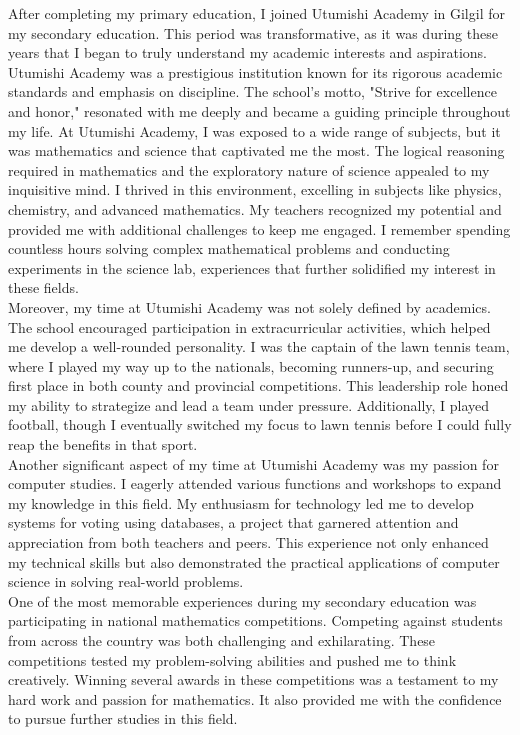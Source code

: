 \documentclass[12pt,a4paper,sans,english]{report}
\begin{document}
\noindent	After completing my primary education, I joined Utumishi Academy in Gilgil for my secondary education. This period was transformative, as it was during these years that I began to truly understand my academic interests and aspirations. Utumishi Academy was a prestigious institution known for its rigorous academic standards and emphasis on discipline. The school’s motto, "Strive for excellence and honor," resonated with me deeply and became a guiding principle throughout my life.	At Utumishi Academy, I was exposed to a wide range of subjects, but it was mathematics and science that captivated me the most. The logical reasoning required in mathematics and the exploratory nature of science appealed to my inquisitive mind. I thrived in this environment, excelling in subjects like physics, chemistry, and advanced mathematics. My teachers recognized my potential and provided me with additional challenges to keep me engaged. I remember spending countless hours solving complex mathematical problems and conducting experiments in the science lab, experiences that further solidified my interest in these fields.\\
	

\noindent Moreover, my time at Utumishi Academy was not solely defined by academics. The school encouraged participation in extracurricular activities, which helped me develop a well-rounded personality. I was the captain of the lawn tennis team, where I played my way up to the nationals, becoming runners-up, and securing first place in both county and provincial competitions. This leadership role honed my ability to strategize and lead a team under pressure. Additionally, I played football, though I eventually switched my focus to lawn tennis before I could fully reap the benefits in that sport.\\

\noindent Another significant aspect of my time at Utumishi Academy was my passion for computer studies. I eagerly attended various functions and workshops to expand my knowledge in this field. My enthusiasm for technology led me to develop systems for voting using databases, a project that garnered attention and appreciation from both teachers and peers. This experience not only enhanced my technical skills but also demonstrated the practical applications of computer science in solving real-world problems.\\
	
\noindent	One of the most memorable experiences during my secondary education was participating in national mathematics competitions. Competing against students from across the country was both challenging and exhilarating. These competitions tested my problem-solving abilities and pushed me to think creatively. Winning several awards in these competitions was a testament to my hard work and passion for mathematics. It also provided me with the confidence to pursue further studies in this field.\\
	
\end{document}
